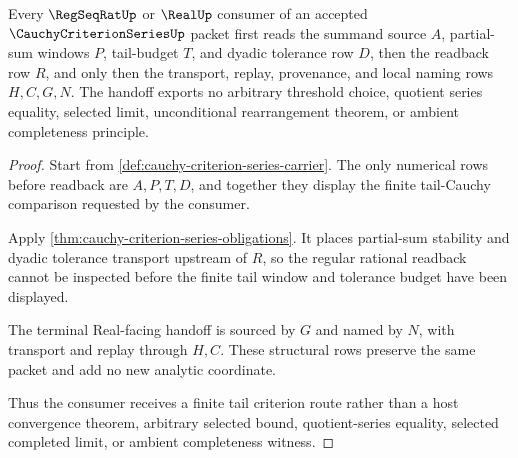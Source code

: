\begin{theorem}
\label{thm:cauchy-criterion-series-finite-tail-handoff}
Every $\RegSeqRatUp$ or $\RealUp$ consumer of an accepted $\CauchyCriterionSeriesUp$ packet first reads the summand source $A$, partial-sum windows $P$, tail-budget $T$, and dyadic tolerance row $D$, then the readback row $R$, and only then the transport, replay, provenance, and local naming rows $H,C,G,N$. The handoff exports no arbitrary threshold choice, quotient series equality, selected limit, unconditional rearrangement theorem, or ambient completeness principle.
\end{theorem}
\begin{proof}
Start from \autoref{def:cauchy-criterion-series-carrier}. The only numerical rows before readback are $A,P,T,D$, and together they display the finite tail-Cauchy comparison requested by the consumer.

Apply \autoref{thm:cauchy-criterion-series-obligations}. It places partial-sum stability and dyadic tolerance transport upstream of $R$, so the regular rational readback cannot be inspected before the finite tail window and tolerance budget have been displayed.

The terminal Real-facing handoff is sourced by $G$ and named by $N$, with transport and replay through $H,C$. These structural rows preserve the same packet and add no new analytic coordinate.

Thus the consumer receives a finite tail criterion route rather than a host convergence theorem, arbitrary selected bound, quotient-series equality, selected completed limit, or ambient completeness witness.
\end{proof}




